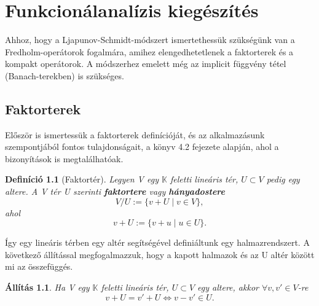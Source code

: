 \documentclass[oneside, titlepage, 12pt, a4paper]{report}
\newtheorem{definition}{Definíció}[section]
\newtheorem{statement}{Állítás}[section]
\begin{document}


\onehalfspacing
\chapter{Funkcionálanalízis kiegészítés}	%
\label{chap:Funcanal_ext}

Ahhoz, hogy a Ljapunov-Schmidt-módszert ismertethessük szükségünk van a Fredholm-operátorok fogalmára, amihez elengedhetetlenek a faktorterek és a kompakt operátorok. A módszerhez emelett még az implicit függvény tétel (Banach-terekben) is szükséges.


%
\section{Faktorterek}
\label{sec:Faktorter}

Először is ismertessük a faktorterek definícióját, és az alkalmazásunk szempontjából fontos tulajdonságait, a \cite{faktorter} könyv 4.2 fejezete alapján, ahol a bizonyítások is megtalálhatóak.
\begin{definition}[Faktortér]
Legyen V egy $\mathbb{K}$ feletti lineáris tér, $U \subset V$ pedig egy altere. A V tér U szerinti \textbf{faktortere} vagy \textbf{hányadostere}
\begin{equation}
V / U := \{v + U \mid v \in V\},
\end{equation}
ahol
\begin{equation}
v + U := \{v + u \mid u \in U \}.
\end{equation}
\end{definition}

Így egy lineáris térben egy altér segítségével definiáltunk egy halmazrendszert. A következő állítással megfogalmazzuk, hogy a kapott halmazok és az U altér között mi az összefüggés.
\begin{statement}
Ha V egy $\mathbb{K}$ feletti lineáris tér, $U \subset V$ egy altere, akkor $\forall v, v' \in V$-re
\begin{equation}
v + U = v' + U \Leftrightarrow v - v' \in U.
\end{equation}
\end{statement}
\end{document}
